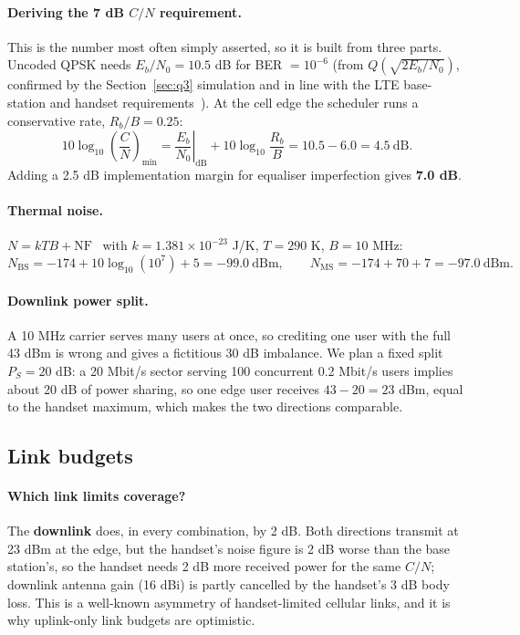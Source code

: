 \documentclass[9pt,a4paper]{article}
\newcommand{\key}[1]{\textbf{#1}}
\begin{document}
\paragraph{Deriving the 7 dB $C/N$ requirement.} This is the number most often simply asserted, so
it is built from three parts. Uncoded QPSK needs $E_b/N_0=10.5$ dB for BER $=10^{-6}$ (from
$Q(\sqrt{2E_b/N_0})$, confirmed by the Section~\ref{sec:q3} simulation and in line with the LTE
base-station and handset requirements~\cite{ts36104,ts36101,rappaport}). At the cell edge the
scheduler runs a conservative rate, $R_b/B=0.25$:
\[
10\log_{10}\!\left(\frac{C}{N}\right)_{\min}
= \left.\frac{E_b}{N_0}\right|_{\text{dB}} + 10\log_{10}\!\frac{R_b}{B}
= 10.5 - 6.0 = 4.5\ \text{dB}.
\]
Adding a 2.5 dB implementation margin for equaliser imperfection gives \key{7.0 dB}.

\paragraph{Thermal noise.} $N=kTB+\text{NF}$~\cite{rappaport} with $k=1.381\times10^{-23}$ J/K, $T=290$ K,
$B=10$ MHz:
\[
N_{\text{BS}} = -174 + 10\log_{10}(10^{7}) + 5 = -99.0\ \text{dBm},\qquad
N_{\text{MS}} = -174 + 70 + 7 = -97.0\ \text{dBm}.
\]

\paragraph{Downlink power split.} A 10 MHz carrier serves many users at once, so crediting one
user with the full 43 dBm is wrong and gives a fictitious 30 dB imbalance. We plan a fixed split
$P_S=20$ dB: a 20 Mbit/s sector serving 100 concurrent 0.2 Mbit/s users implies about 20 dB of
power sharing, so one edge user receives $43-20=23$ dBm, equal to the handset maximum, which
makes the two directions comparable.

\subsection{Link budgets}

\paragraph{Which link limits coverage?} The \key{downlink} does, in every combination, by 2 dB.
Both directions transmit at 23 dBm at the edge, but the handset's noise figure is 2 dB worse than
the base station's, so the handset needs 2 dB more received power for the same $C/N$; downlink
antenna gain (16 dBi) is partly cancelled by the handset's 3 dB body loss. This is a well-known
asymmetry of handset-limited cellular links, and it is why uplink-only link budgets are
optimistic.
\end{document}
